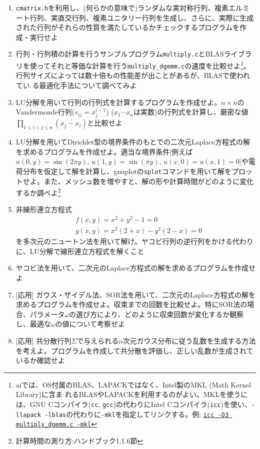 \documentclass[11pt]{jarticle}
\begin{document}
\noindent {\bf [連立一次方程式]}
\begin{enumerate}
\renewcommand{\labelenumi}{3-\arabic{enumi})}

\item {\tt cmatrix.h}を利用し、(何らかの意味で)ランダムな実対称行列、複素エルミート行列、実直交行列、複素ユニタリー行列を生成し、さらに、実際に生成された行列がそれらの性質を満たしているかチェックするプログラムを作成・実行せよ

  \item 行列・行列積の計算を行うサンプルプログラム{\tt multiply.c}とBLASライブラリを使ってそれと等価な計算を行う{\tt multiply\_dgemm.c}の速度を比較せよ\footnote{aiでは、OS付属のBLAS、LAPACKではなく、Intel製のMKL (Math Kernel Library)に含ま
れるBLASやLAPACKを利用するのがよい。MKLを使うには、GNU Cコンパイラ({\tt cc}, {\tt gcc})の代わりにIntel Cコンパイラ({\tt icc})を使い、{\tt -llapack -lblas}の代わりに{\tt -mkl}を指定してリンクする。例: \underline{\tt icc -O3 multiply\_dgemm.c -mkl}}。行列サイズによっては数十倍もの性能差が出ことがあるが、BLASで使われてい
る最適化手法について調べてみよ

\item LU分解を用いて行列の行列式を計算するプログラムを作成せよ。$n \times n$のVandermonde行列($v_{ij}=x_j^{i-1}$) ($x_1 \cdots x_n$は実数)の行列式を計算し、厳密な値$\displaystyle \prod_{1 \le i < j \le n} (x_j-x_i)$と比較せよ
  
\item LU分解を用いてDirichlet型の境界条件のもとでの二次元Laplace方程式の解を求めるプログラムを作成せよ。適当な境界条件[例えば$u(0,y) = \sin(2 \pi y)$, $u(1,y) = \sin(\pi y)$, $u(x,0)=u(x,1)=0$]や電荷分布を仮定して解を計算し、gnuplotの{\tt splot}コマンドを用いて解をプロットせよ。また、メッシュ数を増やすと、解の形や計算時間がどのように変化するか調べよ\footnote{計算時間の測り方:ハンドブック1.1.6節}

\item 非線形連立方程式
  \begin{align*}
    & f(x,y) = x^2 + y^2 - 1 = 0 \\
    & g(x,y) = x^2(2+x) - y^2 (2-x) = 0
  \end{align*}
  を多次元のニュートン法を用いて解け。ヤコビ行列の逆行列をかける代わりに、LU分解で線形連立方程式を解くこと

\item ヤコビ法を用いて、二次元のLaplace方程式の解を求めるプログラムを作成せよ

\item \mbox{} [応用] ガウス・ザイデル法、SOR法を用いて、二次元のLaplace方程式の解を求めるプログラムを作成せよ。収束までの回数を比較せよ。特にSOR法の場合、パラメータ$\omega$の選び方により、どのように収束回数が変化するか観察し、最適な$\omega$の値について考察せよ

\item \mbox{} [応用] 共分散行列$\Sigma$で与えられる$n$次元ガウス分布に従う乱数を生成する方法を考えよ。プログラムを作成して共分散を評価し、正しい乱数が生成されているか確認せよ

\end{enumerate}
\end{document}
